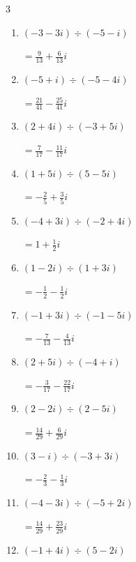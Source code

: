 \begin{multicols}{3}
\begin{enumerate}
        $\displaystyle =\frac{13}{17}+\frac{1}{17}i$

  \item $\displaystyle (-3-3i)\div(-5-i)$

        $\displaystyle =\frac{9}{13}+\frac{6}{13}i$

  \item $\displaystyle (-5+i)\div(-5-4i)$

        $\displaystyle =\frac{21}{41}-\frac{25}{41}i$

  \item $\displaystyle (2+4i)\div(-3+5i)$

        $\displaystyle =\frac{7}{17}-\frac{11}{17}i$

  \item $\displaystyle (1+5i)\div(5-5i)$

        $\displaystyle =-\frac{2}{5}+\frac{3}{5}i$

\columnbreak %

  \item $\displaystyle (-4+3i)\div(-2+4i)$

        $\displaystyle =1+\frac{1}{2}i$

  \item $\displaystyle (1-2i)\div(1+3i)$

        $\displaystyle =-\frac{1}{2}-\frac{1}{2}i$

  \item $\displaystyle (-1+3i)\div(-1-5i)$

        $\displaystyle =-\frac{7}{13}-\frac{4}{13}i$

  \item $\displaystyle (2+5i)\div(-4+i)$

        $\displaystyle =-\frac{3}{17}-\frac{22}{17}i$

  \item $\displaystyle (2-2i)\div(2-5i)$

        $\displaystyle =\frac{14}{29}+\frac{6}{29}i$

  \item $\displaystyle (3-i)\div(-3+3i)$

        $\displaystyle =-\frac{2}{3}-\frac{1}{3}i$

  \item $\displaystyle (-4-3i)\div(-5+2i)$

        $\displaystyle =\frac{14}{29}+\frac{23}{29}i$

  \item $\displaystyle (-1+4i)\div(5-2i)$


\end{enumerate}
\end{multicols}

